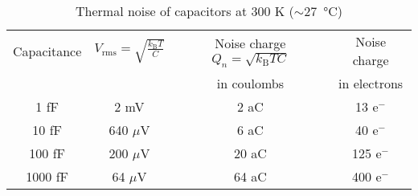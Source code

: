 \documentclass{article}
\begin{document}
\begin{table}[h!]
\centering
\caption{Thermal noise of capacitors at 300 K ($\sim$\SI{27}{\degreeCelsius})}
\label{tab:thermal_noise}
\begin{tabular}{cccc}
\toprule
Capacitance & $V_\text{rms} = \sqrt{\frac{k_{\text{B}}T}{C}}$ & Noise charge $Q_{n} = \sqrt{k_{\text{B}}TC}$ & Noise charge \\
 & & in coulombs & in electrons \\
\midrule
1 fF & 2 mV & 2 aC & 13 e$^{-}$ \\
10 fF & 640 $\mu$V & 6 aC & 40 e$^{-}$ \\
100 fF & 200 $\mu$V & 20 aC & 125 e$^{-}$ \\
1000 fF & 64 $\mu$V & 64 aC & 400 e$^{-}$ \\
\bottomrule
\end{tabular}
\end{table}
\end{document}
